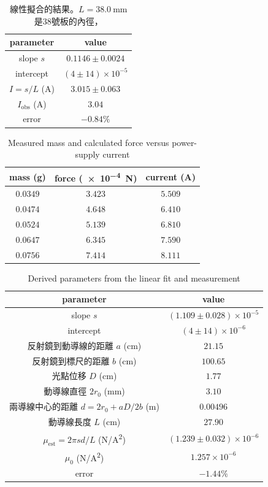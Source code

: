 \begin{table}[htb!]
\centering
\caption{線性擬合的結果。$L= \qty{38.0}{\mm}$ 是38號板的內徑，}
\begin{tabular}{cc}
\toprule
parameter & value \\
\midrule
slope $s$ & $0.1146 \pm 0.0024$ \\
intercept & $(4 \pm 14)\times 10^{-5}$ \\
$I=s/L$ (\unit{\A}) & $3.015 \pm 0.063$ \\
$I_{\text{obs}}$ (\unit{\A}) & $3.04$ \\
error & $-0.84\%$ \\
\bottomrule
\end{tabular}
\end{table}
\begin{table}[htb!]
\centering
\caption{Measured mass and calculated force versus power-supply current}
\begin{tabular}{ccc}
\toprule
mass (\unit{\g}) & force (\qty{e-4}{\N}) & current (\unit{\A}) \\
\midrule
$0.0349$ & $3.423$ & $5.509$ \\
$0.0474$ & $4.648$ & $6.410$ \\
$0.0524$ & $5.139$ & $6.810$ \\
$0.0647$ & $6.345$ & $7.590$ \\
$0.0756$ & $7.414$ & $8.111$ \\
\bottomrule
\end{tabular}
\end{table}
\begin{table}[htb!]
\centering
\caption{Derived parameters from the linear fit and measurement}
\begin{tabular}{cc}
\toprule
parameter & value \\
\midrule
slope $s$ & $(1.109 \pm 0.028)\times 10^{-5}$ \\
intercept & $(4 \pm 14)\times 10^{-6}$ \\
反射鏡到動導線的距離 $a$ (\unit{\cm}) & $21.15$ \\
反射鏡到標尺的距離 $b$ (\unit{\cm}) & $100.65$ \\
光點位移 $D$ (\unit{\cm}) & $1.77$ \\
動導線直徑 $2r_{0}$ (\unit{\mm}) & $3.10$ \\
兩導線中心的距離 $d=2r_{0}+aD/2b$ (\unit{\m}) & $0.00496$ \\
動導線長度 $L$ (\unit{\cm}) & $27.90$ \\
$\mu_{\text{est}}=2\pi sd/L$ (\unit{\N/\square\A}) & $(1.239 \pm 0.032)\times 10^{-6}$ \\
$\mu_0$ (\unit{\N/\square\A}) & $1.257\times 10^{-6}$ \\
error & $-1.44\%$ \\
\bottomrule
\end{tabular}
\end{table}
